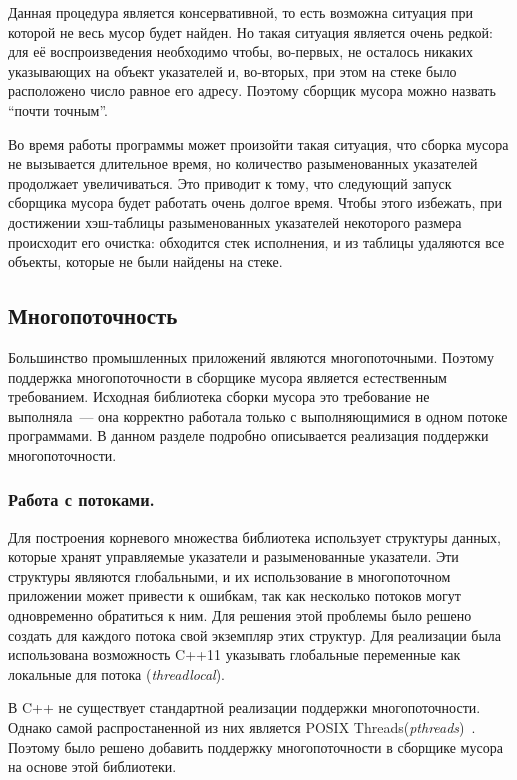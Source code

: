 Данная процедура является консервативной, то есть возможна ситуация при которой не весь мусор будет найден. Но такая ситуация является очень редкой: для её воспроизведения необходимо чтобы, во-первых, не осталось никаких указывающих на объект указателей и, во-вторых, при этом на стеке было расположено число равное его адресу. Поэтому сборщик мусора можно назвать ``почти точным''.

Во время работы программы может произойти такая ситуация, что сборка мусора не вызывается длительное время, но количество разыменованных указателей продолжает увеличиваться. Это приводит к тому, что следующий запуск сборщика мусора будет работать очень долгое время. Чтобы этого избежать, при достижении хэш-таблицы разыменованных указателей некоторого размера происходит его очистка: обходится стек исполнения, и из таблицы удаляются все объекты, которые не были найдены на стеке.
\subsection{Многопоточность}
Большинство промышленных приложений являются многопоточными. Поэтому поддержка многопоточности в сборщике мусора является естественным требованием. Исходная библиотека сборки мусора это требование не выполняла~--- она корректно работала только с выполняющимися в одном потоке программами. В данном разделе подробно описывается реализация поддержки многопоточности.

\subsubsection{Работа с потоками.}
Для построения корневого множества библиотека использует структуры данных, которые
хранят управляемые указатели и разыменованные указатели. Эти структуры являются глобальными, и их использование в многопоточном приложении может привести к ошибкам, так как несколько потоков могут одновременно обратиться к ним.
Для решения этой проблемы было решено создать для каждого потока свой экземпляр этих структур. Для реализации была использована возможность C++11 указывать
глобальные переменные как локальные для потока (\textit{threadlocal}).

В C++ не существует стандартной реализации поддержки многопоточности. 
Однако самой распростаненной из них является POSIX Threads(\textit{pthreads})~\cite{pthreads}. Поэтому было решено добавить поддержку многопоточности в сборщике мусора на основе этой библиотеки.

